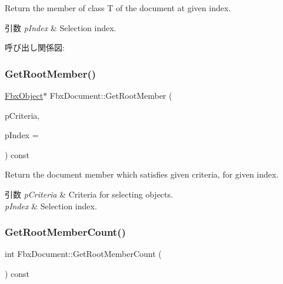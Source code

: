 Return the member of class T of the document at given index. 
\begin{DoxyParams}{引数}
{\em p\+Index} & Selection index. \\
\hline
\end{DoxyParams}
呼び出し関係図\+:
\mbox{\label{class_fbx_document_a7d851d995f21549ff38989289e583086}} 
\subsubsection{\texorpdfstring{Get\+Root\+Member()}{GetRootMember()}\hspace{0.1cm}{\footnotesize\ttfamily [3/3]}}
{\footnotesize\ttfamily \hyperlink{class_fbx_object}{Fbx\+Object}$\ast$ Fbx\+Document\+::\+Get\+Root\+Member (\begin{DoxyParamCaption}\item[{\hyperlink{class_fbx_criteria}{Fbx\+Criteria}}]{p\+Criteria,  }\item[{int}]{p\+Index = {} }\end{DoxyParamCaption}) const}

Return the document member which satisfies given criteria, for given index. 
\begin{DoxyParams}{引数}
{\em p\+Criteria} & Criteria for selecting objects. \\
\hline
{\em p\+Index} & Selection index. \\
\hline
\end{DoxyParams}
\mbox{\label{class_fbx_document_a2fdc38f71ba7db1271c9372e1b3704ec}} 
\subsubsection{\texorpdfstring{Get\+Root\+Member\+Count()}{GetRootMemberCount()}\hspace{0.1cm}{\footnotesize\ttfamily [1/3]}}
{\footnotesize\ttfamily int Fbx\+Document\+::\+Get\+Root\+Member\+Count (\begin{DoxyParamCaption}{ }\end{DoxyParamCaption}) const}



